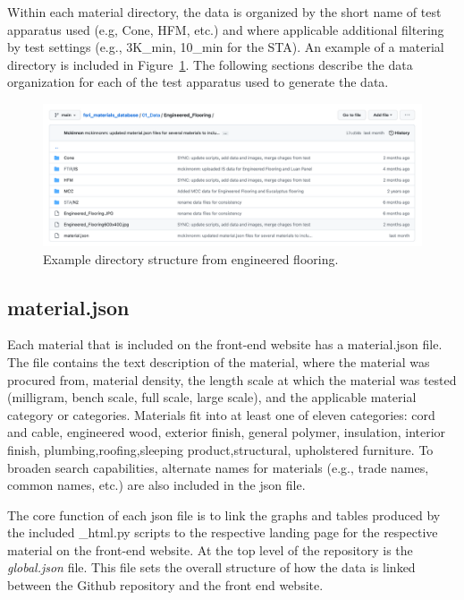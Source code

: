 \documentclass[12pt,oneside]{book}
\begin{document}
Within each material directory, the data is organized by the short name of test apparatus used (e.g, Cone, HFM, etc.) and where applicable additional filtering by test settings (e.g., 3K\_min, 10\_min for the STA). An example of a material directory is included in Figure~\ref{fig:mat_example}. The following sections describe the data organization for each of the test apparatus used to generate the data.

\begin{figure}[!ht]
\centering
\includegraphics[width=.95\columnwidth]{Figures/engineered_flooring_example}
\caption[Engineered Flooring Material Directory Example]{Example directory structure from engineered flooring.}
\label{fig:mat_example}
\end{figure}

\subsection{material.json}
Each material that is included on the front-end website has a material.json file. The file contains the text description of the material, where the material was procured from, material density, the length scale at which the material was tested (milligram, bench scale, full scale, large scale), and the applicable material category or categories. Materials fit into at least one of eleven categories: cord and cable, engineered wood, exterior finish, general polymer, insulation, interior finish, plumbing,roofing,sleeping product,structural, upholstered furniture. To broaden search capabilities, alternate names for materials (e.g., trade names, common names, etc.) are also included in the json file.

The core function of each json file is to link the graphs and tables produced by the included \_html.py scripts to the respective landing page for the respective material on the front-end website. At the top level of the repository is the {\em global.json} file. This file sets the overall structure of how the data is linked between the Github repository and the front end website.
\end{document}
